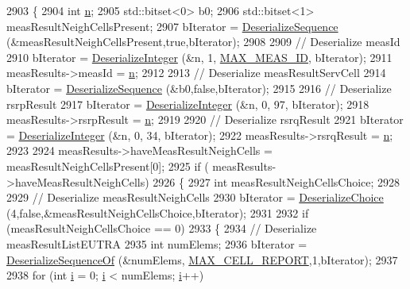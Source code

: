 \begin{DoxyCode}
2903 \{
2904   \textcolor{keywordtype}{int} \hyperlink{namespacesample-rng-plot_aeb5ee5c431e338ef39b7ac5431242e1d}{n};
2905   std::bitset<0> b0;
2906   std::bitset<1> measResultNeighCellsPresent;
2907   bIterator = \hyperlink{classns3_1_1Asn1Header_a58c68bb97ba3fe2e8fcdd7c208d672b2}{DeserializeSequence} (&measResultNeighCellsPresent,\textcolor{keyword}{true},bIterator);
2908 
2909   \textcolor{comment}{// Deserialize measId}
2910   bIterator = \hyperlink{classns3_1_1Asn1Header_a49802c9af30018b078150e866b6ecae2}{DeserializeInteger} (&n, 1, \hyperlink{lte-rrc-header_8cc_aa360afec99420ceee80ed487493f6a9d}{MAX\_MEAS\_ID}, bIterator);
2911   measResults->measId = \hyperlink{namespacesample-rng-plot_aeb5ee5c431e338ef39b7ac5431242e1d}{n};
2912 
2913   \textcolor{comment}{// Deserialize measResultServCell}
2914   bIterator = \hyperlink{classns3_1_1Asn1Header_a58c68bb97ba3fe2e8fcdd7c208d672b2}{DeserializeSequence} (&b0,\textcolor{keyword}{false},bIterator);
2915 
2916   \textcolor{comment}{// Deserialize rsrpResult}
2917   bIterator = \hyperlink{classns3_1_1Asn1Header_a49802c9af30018b078150e866b6ecae2}{DeserializeInteger} (&n, 0, 97, bIterator);
2918   measResults->rsrpResult = \hyperlink{namespacesample-rng-plot_aeb5ee5c431e338ef39b7ac5431242e1d}{n};
2919 
2920   \textcolor{comment}{// Deserialize rsrqResult}
2921   bIterator = \hyperlink{classns3_1_1Asn1Header_a49802c9af30018b078150e866b6ecae2}{DeserializeInteger} (&n, 0, 34, bIterator);
2922   measResults->rsrqResult = \hyperlink{namespacesample-rng-plot_aeb5ee5c431e338ef39b7ac5431242e1d}{n};
2923 
2924   measResults->haveMeasResultNeighCells = measResultNeighCellsPresent[0];
2925   \textcolor{keywordflow}{if} ( measResults->haveMeasResultNeighCells)
2926     \{
2927       \textcolor{keywordtype}{int} measResultNeighCellsChoice;
2928 
2929       \textcolor{comment}{// Deserialize measResultNeighCells}
2930       bIterator = \hyperlink{classns3_1_1Asn1Header_a0af5881f07a0549a8693a1b75c229a90}{DeserializeChoice} (4,\textcolor{keyword}{false},&measResultNeighCellsChoice,bIterator);
2931 
2932       \textcolor{keywordflow}{if} (measResultNeighCellsChoice == 0)
2933         \{
2934           \textcolor{comment}{// Deserialize measResultListEUTRA}
2935           \textcolor{keywordtype}{int} numElems;
2936           bIterator = \hyperlink{classns3_1_1Asn1Header_a1a7245e05b482df8abade0a060bd0ecc}{DeserializeSequenceOf} (&numElems,
      \hyperlink{lte-rrc-header_8cc_a0a29c59f448f689482054e43277599ab}{MAX\_CELL\_REPORT},1,bIterator);
2937 
2938           \textcolor{keywordflow}{for} (\textcolor{keywordtype}{int} \hyperlink{bernuolliDistribution_8m_a6f6ccfcf58b31cb6412107d9d5281426}{i} = 0; \hyperlink{bernuolliDistribution_8m_a6f6ccfcf58b31cb6412107d9d5281426}{i} < numElems; \hyperlink{bernuolliDistribution_8m_a6f6ccfcf58b31cb6412107d9d5281426}{i}++)

\end{DoxyCode}
